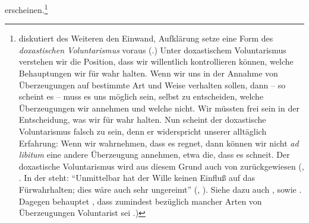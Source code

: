 erscheinen.\footnote{\label{Anmerkung:KantundderDoxastischeVoluntarimus}
diskutiert des Weiteren den Einwand, Aufklärung setze eine Form des
\emph{doxastischen Voluntarismus}
voraus \mkbibparens{\cite[vgl.][38--40]{Scholz:KantsAufklaerungsprogramm2009}.}
Unter doxastischem Voluntarismus verstehen wir die Position, dass wir
willentlich kontrollieren können, welche Behauptungen wir für wahr halten. Wenn
wir uns in der Annahme von Überzeugungen auf bestimmte Art und Weise
verhalten sollen, dann -- so scheint es -- muss es uns möglich sein, selbst zu
entscheiden, welche Überzeugungen wir annehmen und welche nicht. Wir müssten
frei sein in der Entscheidung, was wir für wahr halten. Nun scheint der
doxastische Voluntarismus falsch zu sein, denn er widerspricht unserer
alltäglich Erfahrung: Wenn wir wahrnehmen, dass es regnet, dann können wir
nicht \emph{ad libitum} eine andere Überzeugung annehmen, etwa die, dass es
schneit. Der doxastische Voluntarismus wird aus diesem Grund auch von
 zurückgewiesen \mkbibparens{\cite[vgl.][]{Kant:Reflexionen1900ff.}, \cite[][XVI:
398.11--14]{Kant:GesammelteWerke1900ff.}. In der {\jaeschelogik} steht: \enquote{Unmittelbar hat der Wille keinen Einfluß
auf das Fürwahrhalten; dies wäre auch sehr ungereimt} \mkbibparens{\cite[][A
113]{Kant:ImmanuelKantsLogik1977}, \cite[][IX:
73.33--34]{Kant:GesammelteWerke1900ff.}}. Siehe dazu auch
\cite[][]{Cohen:KantontheEthicsofBelief2014}, sowie
\cite{Cohen:KantonDoxasticVoluntarismanditsImplicationsfortheEthicsofBelief2013}.
Dagegen behauptet ,
dass  zumindest bezüglich mancher Arten von Überzeugungen
Voluntarist sei
\parencite[vgl.][36]{Chignell:KantsConceptsofJustification2007}.}}

